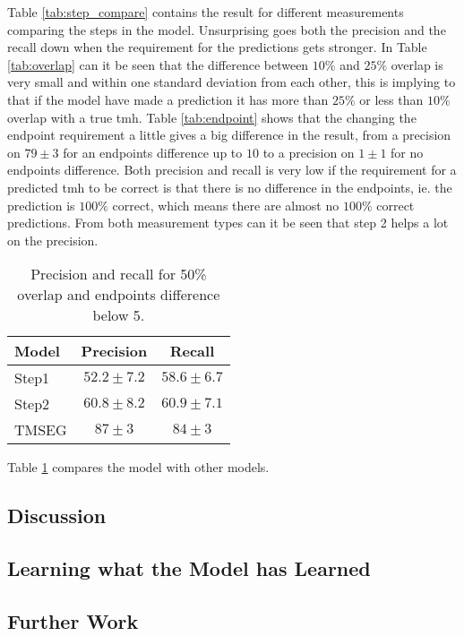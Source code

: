Table \ref{tab:step_compare} contains the result for different measurements 
comparing the steps in the model. Unsurprising goes both the precision and the 
recall down when the requirement for the predictions gets stronger. In 
Table \ref{tab:overlap} can it be seen that the difference between $10\%$ and $25\%$
overlap is very small and within one standard deviation from each other, 
this is implying to that if the model have made a prediction it has more than 
$25\%$ or less than $10\%$ overlap with a true \gls{tmh}.
Table \ref{tab:endpoint} shows that the changing the endpoint requirement a little 
gives a big difference in the result, from a precision on $79 \pm 3$ for an endpoints 
difference up to $10$ to a precision on $1 \pm 1$ for no endpoints difference.
Both precision and recall is very low if the requirement for a predicted \gls{tmh}
to be correct is that there is no difference in the endpoints, ie. the prediction 
is $100\%$ correct, which means there are almost no $100\%$ correct predictions.
From both measurement types can it be seen that step 2 helps a lot on the precision.

\begin{table}
	\centering 
	\begin{tabular}{l|c|c} 
		Model & Precision & Recall \\ \hline 
		Step1 & $52.2 \pm 7.2$ & $58.6 \pm 6.7$ \\ 
		Step2 & $60.8 \pm 8.2$ & $60.9 \pm 7.1$ \\ 
		TMSEG\cite{tmseg} & $87 \pm 3$ & $84 \pm 3$
	\end{tabular}
    \caption{Precision and recall for 50\% overlap and endpoints difference below 5.}
	\label{tab:pr50}
\end{table}

Table \ref{tab:pr50} compares the model with other models.

\subsection{Discussion}

\subsection{Learning what the Model has Learned}

\subsection{Further Work}
